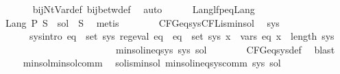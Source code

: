 \begin{isabellebody}
\ \ \ \ \ \ \isamarkupfalse%
\ bij{\isacharunderscore}{\kern0pt}Nt{\isacharunderscore}{\kern0pt}Var{\isacharunderscore}{\kern0pt}def\ bij{\isacharunderscore}{\kern0pt}betw{\isacharunderscore}{\kern0pt}def\ \isamarkupfalse%
\ auto\isanewline
\ \ \ \ \isamarkupfalse%
\ Lang{\isacharunderscore}{\kern0pt}lfp{\isacharunderscore}{\kern0pt}eq{\isacharunderscore}{\kern0pt}Lang\ \isamarkupfalse%
\ {\isacharasterisk}{\kern0pt}{\isacharasterisk}{\kern0pt}{\isacharasterisk}{\kern0pt}{\isacharcolon}{\kern0pt}\ {\isachardoublequoteopen}Lang\ P\ S\ {\isacharequal}{\kern0pt}\ {\isacharquery}{\kern0pt}sol\ {\isacharparenleft}{\kern0pt}{\isasymgamma}{\isacharprime}{\kern0pt}\ S{\isacharparenright}{\kern0pt}{\isachardoublequoteclose}\ \isamarkupfalse%
\ metis\isanewline
\ \ \ \ \isamarkupfalse%
\ {\isacharasterisk}{\kern0pt}\ {\isacharasterisk}{\kern0pt}{\isacharasterisk}{\kern0pt}\ CFG{\isacharunderscore}{\kern0pt}eq{\isacharunderscore}{\kern0pt}sys{\isachardot}{\kern0pt}CFL{\isacharunderscore}{\kern0pt}is{\isacharunderscore}{\kern0pt}min{\isacharunderscore}{\kern0pt}sol\ \isamarkupfalse%
\ sys\isanewline
\ \ \ \ \ \ \ sys{\isacharunderscore}{\kern0pt}intro{\isacharcolon}{\kern0pt}\ {\isachardoublequoteopen}{\isacharparenleft}{\kern0pt}{\isasymforall}eq\ {\isasymin}\ set\ sys{\isachardot}{\kern0pt}\ reg{\isacharunderscore}{\kern0pt}eval\ eq{\isacharparenright}{\kern0pt}\ {\isasymand}\ {\isacharparenleft}{\kern0pt}{\isasymforall}eq\ {\isasymin}\ set\ sys{\isachardot}{\kern0pt}\ {\isasymforall}x\ {\isasymin}\ vars\ eq{\isachardot}{\kern0pt}\ x\ {\isacharless}{\kern0pt}\ length\ sys{\isacharparenright}{\kern0pt}\isanewline
\ \ \ \ \ \ \ \ \ \ \ \ \ \ \ \ \ \ \ \ \ \ \ \ {\isasymand}\ min{\isacharunderscore}{\kern0pt}sol{\isacharunderscore}{\kern0pt}ineq{\isacharunderscore}{\kern0pt}sys\ sys\ {\isacharquery}{\kern0pt}sol{\isachardoublequoteclose}\isanewline
\ \ \ \ \ \ \isamarkupfalse%
\ CFG{\isacharunderscore}{\kern0pt}eq{\isacharunderscore}{\kern0pt}sys{\isacharunderscore}{\kern0pt}def\ \isamarkupfalse%
\ blast\isanewline
\ \ \ \ \isamarkupfalse%
\ min{\isacharunderscore}{\kern0pt}sol{\isacharunderscore}{\kern0pt}min{\isacharunderscore}{\kern0pt}sol{\isacharunderscore}{\kern0pt}comm\ \isamarkupfalse%
\ sol{\isacharunderscore}{\kern0pt}is{\isacharunderscore}{\kern0pt}min{\isacharunderscore}{\kern0pt}sol{\isacharcolon}{\kern0pt}\ {\isachardoublequoteopen}min{\isacharunderscore}{\kern0pt}sol{\isacharunderscore}{\kern0pt}ineq{\isacharunderscore}{\kern0pt}sys{\isacharunderscore}{\kern0pt}comm\ sys\ {\isacharquery}{\kern0pt}sol{\isachardoublequoteclose}\ \isamarkupfalse%

\end{isabellebody}

